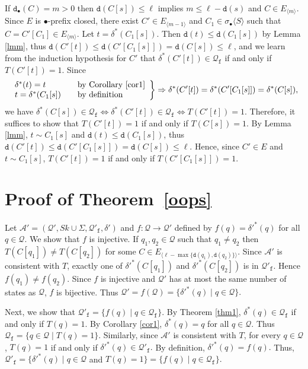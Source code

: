 \documentclass[preprint,12pt,english]{article}
\def\hole{\bullet}
\def\cA{\mathcal{A}}
\def\cQ{\mathcal{Q}}
\def\depth{\mathtt{d}}
\newcommand\pair[1]{\langle{#1}\rangle}
\begin{document}
If $\depth_\hole(C)=m>0$ then $\depth(C[s])\leq \ell$ implies $m\leq \ell-\depth(s)$ and $C\in E_{\pair{m}}.$ Since $E$ is $\hole$-prefix closed, there exist $C'\in E_{\pair{m-1}}$ and $C_1\in\sigma_\hole\pair{S}$ such that $C=C'[C_1]\in E_{\pair{m}}.$ Let $t=\delta^*(C_1[s]).$ Then $\depth(t)\leq\depth(C_1[s])$ by Lemma \ref{lmm}, thus $\depth(C'[t])\leq \depth(C'[C_1[s]])=\depth(C[s])\leq \ell$, and we learn from the induction hypothesis for $C'$ that $\delta^*(C'[t])\in \cQ_{\mathtt{f}}$ if and only if $T(C'[t])=1.$ Since 
$$\left.\begin{array}{ll}
\delta^*(t)=t&\text{by Corollary \ref{cor1}}\\
t=\delta^*(C_1[s])\quad&\text{by definition}
\end{array}\right\}\Rightarrow \delta^*(C'[t])=\delta^*(C'[C_1[s]])=\delta^*(C[s]),$$
we have $\delta^*(C[s])\in\cQ_{\mathtt{f}}\Leftrightarrow \delta^*(C'[t])\in \cQ_{\mathtt{f}}\Leftrightarrow T(C'[t])=1.$
Therefore, it suffices to show that $T(C'[t])=1$ if and only if $T(C[s])=1$. By Lemma \ref{lmm}, $t\sim C_1[s]$ and $\depth(t)\leq\depth(C_1[s])$, thus $\depth(C'[t])\leq\depth(C'[C_1[s]])=\depth(C[s])\leq\ell.$
Hence,  since $C'\in E$ and $t\sim C_1[s]$,  $T(C'[t])=1$ if and only if $T(C'[C_1[s]])=1$.  
\section{Proof of Theorem~\ref{oops}}
Let $\cA'=(\cQ',Sk\cup\Sigma,\cQ'_{\mathtt{f}},\delta')$ and $f:\cQ\to\cQ'$ defined by $f(q)=\delta'^*(q)$ for all $q\in \cQ$. We show that $f$ is injective. If $q_1,q_2\in \cQ$ such that $q_1\neq q_2$ then $T(C[q_1])\neq T(C[q_2])$ for some $C\in E_{\pair{\ell-\max\{\depth(q_1),\depth(q_2)\}}}$. Since $\cA'$ is consistent with   $T$, exactly one of $\delta'^*(C[q_1])$ and $\delta'^*(C[q_2])$ is in $\cQ'_{\mathtt{f}}$. Hence $f(q_1)\neq f(q_2).$ 
Since $f$ is injective and $\cQ'$ has at most the same number of states as $\cQ$, $f$ is bijective. Thus $\cQ'=f(\cQ)=\{\delta'^*(q)\mid q\in\cQ\}.$


Next, we show that $\cQ'_{\mathtt{f}}=\{f(q)\mid q\in\cQ_{\mathtt{f}}\}.$ By Theorem \ref{thm1}, $\delta^*(q)\in \cQ_{\mathtt{f}}$ if and only if $T(q)=1.$ By Corollary \ref{cor1}, $\delta^*(q)=q$ for all $q\in\cQ$. Thus $\cQ_{\mathtt{f}}=\{q\in\cQ\mid T(q)=1\}.$ Similarly, since $\cA'$ is consistent with $T$, for every $q\in \cQ$, $T(q)=1$ if and only if $\delta'^*(q)\in\cQ'_{\mathtt{f}}.$ By definition, $\delta'^*(q)=f(q).$ Thus, $\cQ'_{\mathtt{f}}=\{\delta'^*(q)\mid q\in\cQ$ and $T(q)=1\}=\{f(q)\mid q\in\cQ_{\mathtt{f}}\}.$
\end{document}
